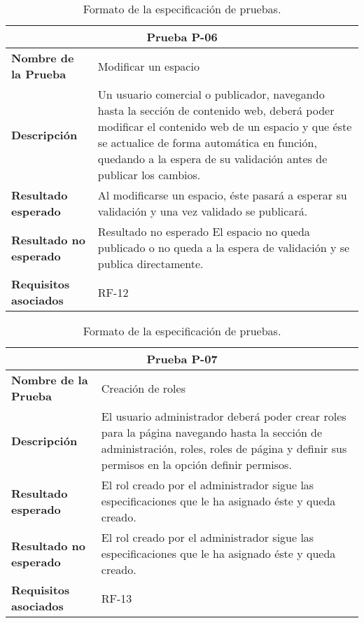 \begin{table}[h]
\begin{center}
\begin{tabular}{ l l }
\multicolumn{2}{c}{Prueba P-06} \\ \hline
\textbf{Nombre de la Prueba} & Modificar un espacio \\
\textbf{Descripción} &Un usuario comercial o publicador, navegando hasta la sección de contenido web, deberá poder modificar el contenido web de un espacio y que éste se actualice de forma automática en función, quedando a la espera de su validación antes de publicar los cambios. \\
\textbf{Resultado esperado} & Al modificarse un espacio, éste pasará a esperar su validación y una vez validado se publicará. \\
\textbf{Resultado no esperado} & Resultado no esperado	El espacio no queda publicado o no queda a la espera de validación y se publica directamente. \\
\textbf{Requisitos asociados} & RF-12\\ \hline
\end{tabular}
\caption{Formato de la especificación de pruebas.}
\label{tab:P6}
\end{center}
\end{table}

\begin{table}[h]
\begin{center}
\begin{tabular}{ l l }
\multicolumn{2}{c}{Prueba P-07} \\ \hline
\textbf{Nombre de la Prueba} & Creación de roles \\
\textbf{Descripción} & El usuario administrador deberá poder crear roles para la página navegando hasta la sección de administración, roles, roles de página y definir sus permisos en la opción definir permisos. \\
\textbf{Resultado esperado} & El rol creado por el administrador sigue las especificaciones que le ha asignado éste y queda creado. \\
\textbf{Resultado no esperado} & El rol creado por el administrador sigue las especificaciones que le ha asignado éste y queda creado. \\
\textbf{Requisitos asociados} & RF-13 \\ \hline
\end{tabular}
\caption{Formato de la especificación de pruebas.}
\label{tab:P7}
\end{center}
\end{table}

